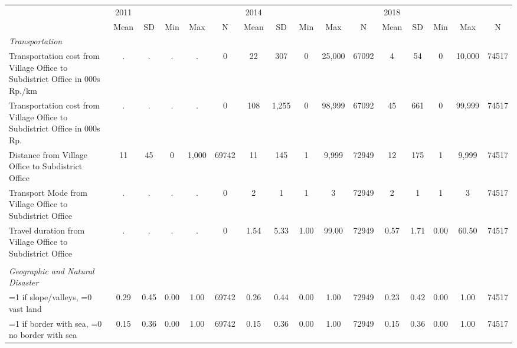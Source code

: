\begin{tabular}{l*{3}{ccccc}}
\toprule
                &     2011&         &         &         &         &     2014&         &         &         &         &     2018&         &         &         &         \\
                &     Mean&       SD&      Min&      Max&        N&     Mean&       SD&      Min&      Max&        N&     Mean&       SD&      Min&      Max&        N\\
\midrule
\emph{Transportation}&         &         &         &         &         &         &         &         &         &         &         &         &         &         &         \\
Transportation cost from Village Office to Subdistrict Office in 000s Rp./km&        .&        .&        .&        .&        0&       22&      307&        0&   25,000&    67092&        4&       54&        0&   10,000&    74517\\
Transportation cost from Village Office to Subdistrict Office in 000s Rp.&        .&        .&        .&        .&        0&      108&    1,255&        0&   98,999&    67092&       45&      661&        0&   99,999&    74517\\
Distance from Village Office to Subdistrict Office&       11&       45&        0&    1,000&    69742&       11&      145&        1&    9,999&    72949&       12&      175&        1&    9,999&    74517\\
Transport Mode from Village Office to Subdistrict Office&        .&        .&        .&        .&        0&        2&        1&        1&        3&    72949&        2&        1&        1&        3&    74517\\
Travel duration from Village Office to Subdistrict Office&        .&        .&        .&        .&        0&     1.54&     5.33&     1.00&    99.00&    72949&     0.57&     1.71&     0.00&    60.50&    74517\\
\vspace{0.1em} \\ \emph{Geographic and Natural Disaster}&         &         &         &         &         &         &         &         &         &         &         &         &         &         &         \\
=1 if slope/valleys, =0 vast land&     0.29&     0.45&     0.00&     1.00&    69742&     0.26&     0.44&     0.00&     1.00&    72949&     0.23&     0.42&     0.00&     1.00&    74517\\
=1 if border with sea, =0 no border with sea&     0.15&     0.36&     0.00&     1.00&    69742&     0.15&     0.36&     0.00&     1.00&    72949&     0.15&     0.36&     0.00&     1.00&    74517\\

\end{tabular}
